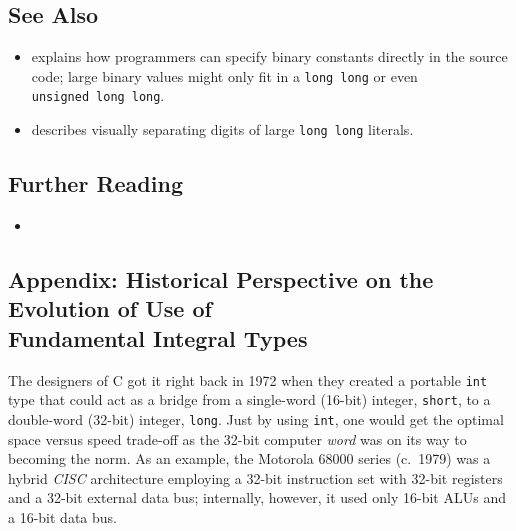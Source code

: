 \subsection[See Also]{See Also}\label{see-also}

\begin{itemize}
\item{explains how programmers can specify binary constants directly in the source code; large binary values might only fit in a \lstinline!long!~\lstinline!long! or even \lstinline!unsigned!~\lstinline!long!~\lstinline!long!.}
\item{describes visually separating digits of large \lstinline!long!~\lstinline!long! literals.}
\end{itemize}

\subsection[Further Reading]{Further Reading}\label{further-reading}

\begin{itemize}
\item{\cite{adamczyk05}}
\end{itemize}

\subsection[Appendix: Historical Perspective on the Evolution of Use of Fundamental Integral Types]{Appendix: Historical Perspective on the Evolution of Use of\\ Fundamental Integral Types}\label{longlong-appendix}
\label{historical-perspective-on-the-evolution-of-use-of-fundamental-integral-types}

The designers of C got it right back in 1972 when
they created a portable \lstinline!int! type that could act as a bridge
from a single-word (16-bit) integer, \lstinline!short!, to a double-word
(32-bit) integer, \lstinline!long!. Just by using \lstinline!int!, one would
get the optimal space versus speed trade-off as the 32-bit computer \emph{word}
was on its way to becoming the norm. As an example, the Motorola
68000 series (c.~1979) was a hybrid \emph{CISC} architecture employing
a 32-bit instruction set with 32-bit registers and a 32-bit external
data bus; internally, however, it used only 16-bit ALUs and a 16-bit
  data bus.

